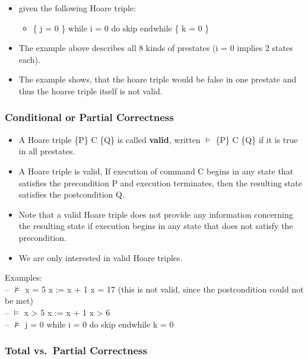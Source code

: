 \begin{itemize}
\tightlist
\item
  given the following Hoare triple:

  \begin{itemize}
  \tightlist
  \item
    \{ j = 0 \} while i = 0 do skip endwhile \{ k = 0 \}
  \end{itemize}
\item
  The example above describes all 8 kinds of prestates (i = 0 implies 2
  states each).
\item
  The example shows, that the hoare triple would be false in one
  prestate and thus the hoarse triple itself is not valid.
\end{itemize}

\hypertarget{conditional-or-partial-correctness}{%
\subsubsection{Conditional or Partial
Correctness}\label{conditional-or-partial-correctness}}

\begin{itemize}
\tightlist
\item
  A Hoare triple \{P\} C \{Q\} is called \textbf{valid}, written $\models$ \{P\}
  C \{Q\} if it is true in all prestates.
\item
  A Hoare triple is valid, If execution of command C begins in any state
  that satisfies the precondition P and execution terminates, then the
  resulting state satisfies the postcondition Q.
\item
  Note that a valid Hoare triple does not provide any information
  concerning the resulting state if execution begins in any state that
  does not satisfy the precondition.
\item
  We are only interested in valid Hoare triples.
\end{itemize}

\begin{tcolorbox}[colback=red!5!white,colframe=red!75!black]
Examples: \\
– $\nvDash$ { x = 5 } x := x + 1 { x = 17 } (this is not valid, since the postcondition could not be met) \\
– $\models$ { x > 5 } x := x + 1 { x > 6 } \\
– $\nvDash$ { j = 0 } while i = 0 do skip endwhile { k = 0 }
\end{tcolorbox}

\hypertarget{total-vs.partial-correctness}{%
\subsubsection{Total vs.~Partial
Correctness}\label{total-vs.partial-correctness}}

